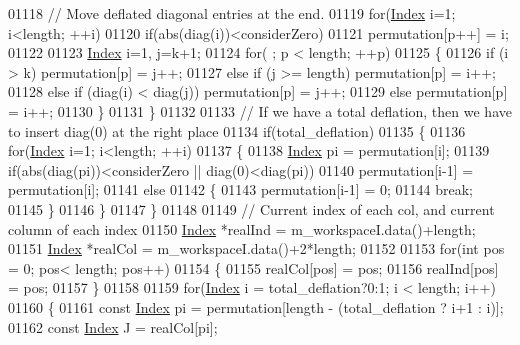 \begin{DoxyCode}
01118       \textcolor{comment}{// Move deflated diagonal entries at the end.}
01119       \textcolor{keywordflow}{for}(\hyperlink{namespace_eigen_a62e77e0933482dafde8fe197d9a2cfde}{Index} i=1; i<length; ++i)
01120         \textcolor{keywordflow}{if}(abs(diag(i))<considerZero)
01121           permutation[p++] = i;
01122         
01123       \hyperlink{namespace_eigen_a62e77e0933482dafde8fe197d9a2cfde}{Index} i=1, j=k+1;
01124       \textcolor{keywordflow}{for}( ; p < length; ++p)
01125       \{
01126              \textcolor{keywordflow}{if} (i > k)             permutation[p] = j++;
01127         \textcolor{keywordflow}{else} \textcolor{keywordflow}{if} (j >= length)       permutation[p] = i++;
01128         \textcolor{keywordflow}{else} \textcolor{keywordflow}{if} (diag(i) < diag(j)) permutation[p] = j++;
01129         \textcolor{keywordflow}{else}                        permutation[p] = i++;
01130       \}
01131     \}
01132     
01133     \textcolor{comment}{// If we have a total deflation, then we have to insert diag(0) at the right place}
01134     \textcolor{keywordflow}{if}(total\_deflation)
01135     \{
01136       \textcolor{keywordflow}{for}(\hyperlink{namespace_eigen_a62e77e0933482dafde8fe197d9a2cfde}{Index} i=1; i<length; ++i)
01137       \{
01138         \hyperlink{namespace_eigen_a62e77e0933482dafde8fe197d9a2cfde}{Index} pi = permutation[i];
01139         \textcolor{keywordflow}{if}(abs(diag(pi))<considerZero || diag(0)<diag(pi))
01140           permutation[i-1] = permutation[i];
01141         \textcolor{keywordflow}{else}
01142         \{
01143           permutation[i-1] = 0;
01144           \textcolor{keywordflow}{break};
01145         \}
01146       \}
01147     \}
01148     
01149     \textcolor{comment}{// Current index of each col, and current column of each index}
01150     \hyperlink{namespace_eigen_a62e77e0933482dafde8fe197d9a2cfde}{Index} *realInd = m\_workspaceI.data()+length;
01151     \hyperlink{namespace_eigen_a62e77e0933482dafde8fe197d9a2cfde}{Index} *realCol = m\_workspaceI.data()+2*length;
01152     
01153     \textcolor{keywordflow}{for}(\textcolor{keywordtype}{int} pos = 0; pos< length; pos++)
01154     \{
01155       realCol[pos] = pos;
01156       realInd[pos] = pos;
01157     \}
01158     
01159     \textcolor{keywordflow}{for}(\hyperlink{namespace_eigen_a62e77e0933482dafde8fe197d9a2cfde}{Index} i = total\_deflation?0:1; i < length; i++)
01160     \{
01161       \textcolor{keyword}{const} \hyperlink{namespace_eigen_a62e77e0933482dafde8fe197d9a2cfde}{Index} pi = permutation[length - (total\_deflation ? i+1 : i)];
01162       \textcolor{keyword}{const} \hyperlink{namespace_eigen_a62e77e0933482dafde8fe197d9a2cfde}{Index} J = realCol[pi];

\end{DoxyCode}

